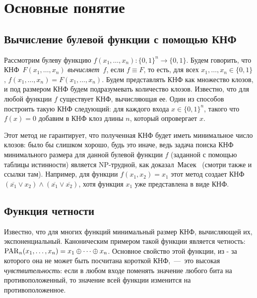 \section{Основные понятие}

\subsection{Вычисление булевой функции с помощью КНФ}
Рассмотрим булеву функцию $f(x_1, \dotsc, x_n) \colon \{0,1\}^n \to \{0,1\}$. 
Будем говорить, что КНФ~$F(x_1, \dotsc, x_n)$ \emph{вычисляет~$f$}, если $f \equiv F$, то есть, для всех $x_1, \dotsc, x_n \in \{0,1\}$, $f(x_1, \dotsc, x_n)=F(x_1, \dotsc, x_n)$. 
Будем представлять КНФ как множество клозов, и под размером КНФ будем подразумевать количество клозов. Известно, что для любой функции $f$ существует КНФ, вычисляющая ее. 
Один из способов построить такую КНФ следующий: для каждого входа $x \in \{0,1\}^n$, такого что $f(x) = 0$ добавим в КНФ клоз длины $n$, который опровергает $x$.

Этот метод не гарантирует, что полученная КНФ будет иметь минимальное число клозов:
было бы слишком хорошо, будь это иначе, 
ведь задача поиска КНФ минимального размера для данной булевой функции $f$ (заданной с помощью таблицы истинности) является NP-трудной, как доказал~Масек~\cite{MasekNpComp} 
(смотри также \cite{DBLP:journals/siamcomp/AllenderHMPS08} и ссылки там).
Например, для функции  $f(x_1,x_2)=x_1$ этот метод
создает КНФ $(\overline{x_1} \lor x_2) \land (\overline{x_1} \lor \overline{x_2})$, хотя функция $x_1$ уже представлена в виде КНФ.

\subsection{Функция четности}
Известно, что для многих функций минимальный размер КНФ, вычисляющей их, экспоненциальный. 
Каноническим примером такой функции является четность: $\operatorname{PAR}_n(x_1, \dotsc, x_n)=x_1 \oplus \dotsb \oplus x_n$. 
Основное свойство этой функции, из - за которого она не может быть посчитана короткой КНФ,~---~это высокая \emph{чувствительность}:
если в любом входе поменять значение любого бита на противоположенный,
то значение всей функции изменится на противоположенное.

